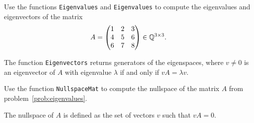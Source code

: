 \begin{prob}
  \label{prob:eigenvalues}
  Use the functions \lstinline{Eigenvalues} and \lstinline{Eigenvalues} to
  compute the eigenvalues and eigenvectors of the matrix
  \[
    A=\begin{pmatrix}	
      1 & 2 & 3\\
      4 & 5 & 6\\
      6 & 7 & 8
    \end{pmatrix}\in\mathbb{Q}^{3\times3}.
  \]

  \textdbend The function \lstinline{Eigenvectors} returns generators of the eigenspaces,
  where $v\ne0$ is an eigenvector of $A$ with eigenvalue $\lambda$ if and only
  if $vA=\lambda v$. 
\end{prob}

\begin{prob}
  Use the function \lstinline{NullspaceMat} to compute the nullspace 
  of the matrix $A$ from problem~\ref{prob:eigenvalues}. 
  
  \textdbend 
  The nullspace of $A$ is defined as the set of vectors $v$ such
  that $vA=0$. 
\end{prob}



